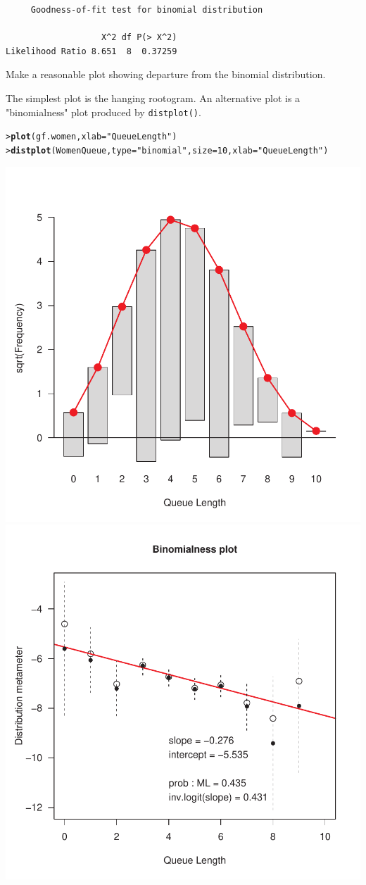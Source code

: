 \documentclass[10pt]{report}\usepackage[]{graphicx}\usepackage[]{color}
\makeatletter
\newcommand{\hlnum}[1]{\textcolor[rgb]{0.686,0.059,0.569}{#1}}%
\newcommand{\hlstr}[1]{\textcolor[rgb]{0.192,0.494,0.8}{#1}}%
\newcommand{\hlstd}[1]{\textcolor[rgb]{0.345,0.345,0.345}{#1}}%
\newcommand{\hlkwc}[1]{\textcolor[rgb]{0.333,0.667,0.333}{#1}}%
\newcommand{\hlkwd}[1]{\textcolor[rgb]{0.737,0.353,0.396}{\textbf{#1}}}%
\newenvironment{kframe}{%
 \def\at@end@of@kframe{}%
 \ifinner\ifhmode%
  \def\at@end@of@kframe{\end{minipage}}%
  \begin{minipage}{\columnwidth}%
 \fi\fi%
 \def\FrameCommand##1{\hskip\@totalleftmargin \hskip-\fboxsep
 \colorbox{shadecolor}{##1}\hskip-\fboxsep
     \hskip-\linewidth \hskip-\@totalleftmargin \hskip\columnwidth}%
 \MakeFramed {\advance\hsize-\width
   \@totalleftmargin\z@ \linewidth\hsize
   \@setminipage}}%
 {\par\unskip\endMakeFramed%
 \at@end@of@kframe}
\newenvironment{knitrout}{}{} %
\renewenvironment{knitrout}{\small\renewcommand{\baselinestretch}{.85}}{} %
\makeatother
\begin{document}
\begin{Exercises}
\begin{enumerate*}
\begin{ans}
\begin{knitrout}
\begin{kframe}
\begin{verbatim}
	 Goodness-of-fit test for binomial distribution

                   X^2 df P(> X^2)
Likelihood Ratio 8.651  8  0.37259
\end{verbatim}
\end{kframe}
\end{knitrout}
    \end{ans}
    
    \item Make a reasonable plot showing departure from the binomial distribution.
    \begin{ans}
The simplest plot is the hanging rootogram.  An alternative plot is a "binomialness" plot produced by \texttt{distplot()}.
\begin{knitrout}\footnotesize
{}\color{fgcolor}\begin{kframe}
\begin{alltt}
\hlstd{> }\hlkwd{plot}\hlstd{(gf.women,} \hlkwc{xlab} \hlstd{=} \hlstr{"Queue Length"}\hlstd{)}
\hlstd{> }\hlkwd{distplot}\hlstd{(WomenQueue,} \hlkwc{type} \hlstd{=} \hlstr{"binomial"}\hlstd{,} \hlkwc{size}\hlstd{=}\hlnum{10}\hlstd{,} \hlkwc{xlab} \hlstd{=} \hlstr{"Queue Length"}\hlstd{)}
\end{alltt}
\end{kframe}

\centerline{\includegraphics[width=.49\textwidth]{soln/fig/ex3_3c-1} 
\includegraphics[width=.49\textwidth]{soln/fig/ex3_3c-2} }




\end{knitrout}
\end{ans}
\end{enumerate*}
\end{Exercises}
\end{document}
